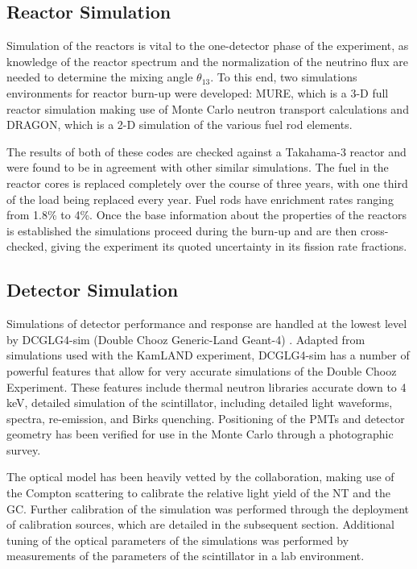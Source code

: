 \subsection{Reactor Simulation}
Simulation of the reactors is vital to the one-detector phase of the experiment, as knowledge of the reactor spectrum and the normalization of the neutrino flux are needed to determine the mixing angle $\theta_{13}$. To this end, two simulations environments for reactor burn-up were developed: MURE, which is a 3-D full reactor simulation making use of Monte Carlo neutron transport calculations and DRAGON, which is a 2-D simulation of the various fuel rod elements. 

The results of both of these codes are checked against a Takahama-3 reactor and were found to be in agreement with other similar simulations. The fuel in the reactor cores is replaced completely over the course of three years, with one third of the load being replaced every year. Fuel rods have enrichment rates ranging from 1.8\% to 4\%. Once the base information about the properties of the reactors is established the simulations proceed during the burn-up and are then cross-checked, giving the experiment its quoted uncertainty in its fission rate fractions.

\subsection{Detector Simulation}
Simulations of detector performance and response are handled at the lowest level by DCGLG4-sim (Double Chooz Generic-Land Geant-4) \cite{DCGLG4sim}. Adapted from simulations used with the KamLAND experiment, DCGLG4-sim has a number of powerful features that allow for very accurate simulations of the Double Chooz Experiment. These features include thermal neutron libraries accurate down to 4 keV, detailed simulation of the scintillator, including detailed light waveforms, spectra, re-emission, and Birks quenching. Positioning of the PMTs and detector geometry has been verified for use in the Monte Carlo through a photographic survey. 

The optical model has been heavily vetted by the collaboration, making use of the Compton scattering to calibrate the relative light yield of the NT and the GC. Further calibration of the simulation was performed through the deployment of calibration sources, which are detailed in the subsequent section. Additional tuning of the optical parameters of the simulations  was performed by measurements of the parameters of the scintillator in a lab environment.

